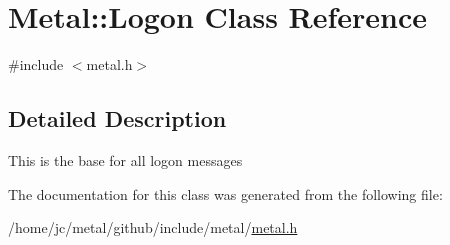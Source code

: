 \hypertarget{classMetal_1_1Logon}{}\section{Metal\+:\+:Logon Class Reference}
\label{classMetal_1_1Logon}


{\ttfamily \#include $<$metal.\+h$>$}



\subsection{Detailed Description}
This is the base for all logon messages 

The documentation for this class was generated from the following file\+:\begin{DoxyCompactItemize}
\item 
/home/jc/metal/github/include/metal/\hyperlink{metal_8h}{metal.\+h}\end{DoxyCompactItemize}
